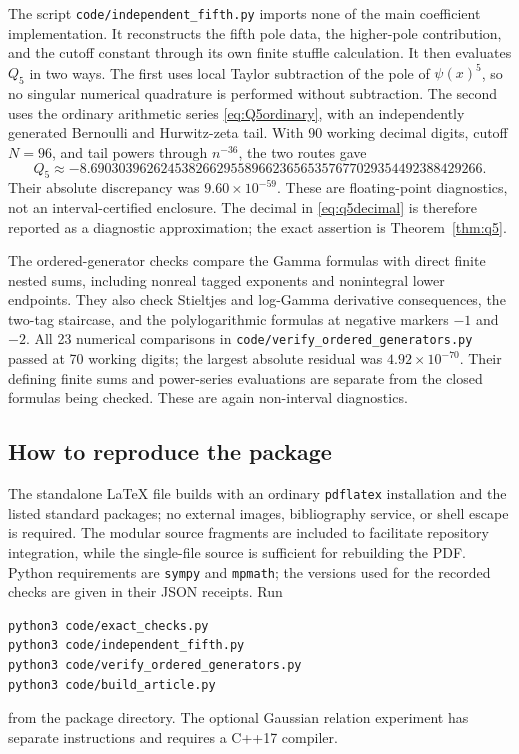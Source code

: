 The script \texttt{code/independent\_fifth.py} imports none of the main
coefficient implementation.  It reconstructs the fifth pole data,
the higher-pole contribution, and the cutoff constant through its own
finite stuffle calculation.  It then evaluates $Q_5$ in two ways.
The first uses local Taylor subtraction of the pole of $\psi(x)^5$,
so no singular numerical quadrature is performed without subtraction.
The second uses the ordinary arithmetic series
\eqref{eq:Q5ordinary}, with an independently generated Bernoulli and
Hurwitz-zeta tail.  With 90 working decimal digits, cutoff $N=96$,
and tail powers through $n^{-36}$, the two routes gave
\begin{equation}
 Q_5\approx
 -8.69030396262453826629558966236565357677029354492388429266.
 \label{eq:q5decimal}
\end{equation}
Their absolute discrepancy was $9.60\times10^{-59}$.
These are floating-point diagnostics, not an interval-certified
enclosure.  The decimal in \eqref{eq:q5decimal} is therefore reported
as a diagnostic approximation; the exact assertion is
Theorem~\ref{thm:q5}.

The ordered-generator checks compare the Gamma formulas with direct
finite nested sums, including nonreal tagged exponents and nonintegral
lower endpoints.  They also check Stieltjes and log-Gamma derivative
consequences, the two-tag staircase, and the polylogarithmic formulas
at negative markers $-1$ and $-2$.  All 23 numerical comparisons in
\texttt{code/verify\_ordered\_generators.py} passed at 70 working
digits; the largest absolute residual was $4.92\times10^{-70}$.
Their defining finite sums and power-series evaluations are separate
from the closed formulas being checked.  These are again
non-interval diagnostics.

\subsection{How to reproduce the package}

The standalone \LaTeX{} file builds with an ordinary \texttt{pdflatex}
installation and the listed standard packages; no external images,
bibliography service, or shell escape is required.  The modular source
fragments are included to facilitate repository integration, while the
single-file source is sufficient for rebuilding the PDF.  Python
requirements are \texttt{sympy} and \texttt{mpmath}; the versions used
for the recorded checks are given in their JSON receipts.  Run
\begin{verbatim}
python3 code/exact_checks.py
python3 code/independent_fifth.py
python3 code/verify_ordered_generators.py
python3 code/build_article.py
\end{verbatim}
from the package directory.  The optional Gaussian relation experiment
has separate instructions and requires a C++17 compiler.

